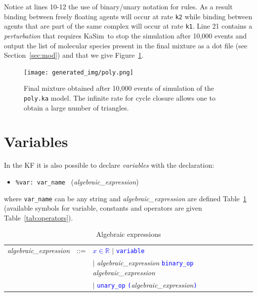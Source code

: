 \documentclass[11pt]{book}
\def\KaSim{\textsf{KaSim}}
\def\tcb#1{\textcolor{blue}{\ttt{#1}}}
\def\ttt#1{\texttt{#1}}
\def\var#1{{\textquotesingle}#1{\textquotesingle}}
\def\ITE#1{\begin{itemize}#1\end{itemize}}
\def\Real{\mathbb R}
\begin{document}
Notice at lines 10-12 the use of binary/unary notation for rules. As a result binding between  freely floating agents will occur at rate \ttt{{\textquotesingle}k2{\textquotesingle}} while binding between agents that are part of the same complex will occur at rate \ttt{{\textquotesingle}k1{\textquotesingle}}. Line 21 contains a \emph{perturbation} that requires \KaSim~to stop the simulation after 10,000 events and output the list of molecular species present in the final mixture as a dot file (see Section~\ref{sec:mod}) and that we give Figure~\ref{fig:species}.

\begin{figure}[htbp]
\begin{center}
\texttt{[image: generated\_img/poly.png]}
\caption{Final mixture obtained after 10,000 events of simulation of the \ttt{poly.ka} model. The infinite rate for cycle closure allows one to obtain a large number of triangles.}
\label{fig:species}
\end{center}
\end{figure}


\section{Variables}\label{sec:var}

In the KF it is also possible to declare \emph{variables} with the declaration:
\ITE{
\item[] \ttt{\%var: \var{var\_name}~} (\textit{algebraic\_expression})
}
where \ttt{var\_name} can be any string and \textit{algebraic\_expression} are defined Table~\ref{tab:alg} (available symbols for variable, constants and operators are given Table~\ref{tab:operators}).

\begin{table}[htbp]
  \centering
  \caption{Algebraic expressions}
  \begin{tabular}{@{} lcl @{}}
    \textit{algebraic\_expression} & ::= & \tcb{$x\in\Real$} $\mid$ \tcb{variable} \\
     &  & $\mid$ \textit{algebraic\_expression} \tcb{binary\_op} \textit{algebraic\_expression}\\
     &  & $\mid$ \tcb{unary\_op} \tcb{(}\textit{algebraic\_expression}\tcb{)} \\
    \end{tabular}
  \label{tab:alg}
\end{table}
\end{document}
